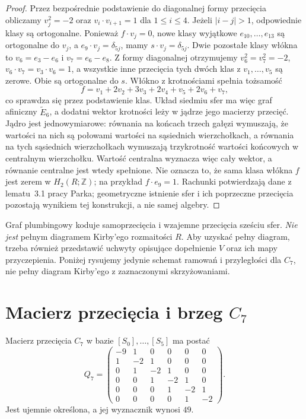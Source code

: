 \begin{proof}
Przez bezpośrednie podstawienie do diagonalnej formy przecięcia
obliczamy $v_j^2=-2$ oraz
$v_i\cdot v_{i+1}=1$ dla $1\le i\le4$.
Jeżeli $|i-j|>1$, odpowiednie klasy są ortogonalne.
Ponieważ $f\cdot v_j=0$, nowe klasy wyjątkowe
$e_{10},\ldots,e_{13}$ są ortogonalne do $v_j$, a
$e_9\cdot v_j=\delta_{5j}$, mamy
$s\cdot v_j=\delta_{5j}$.
Dwie pozostałe klasy włókna to
$v_6=e_3-e_6$ i $v_7=e_6-e_8$.
Z formy diagonalnej otrzymujemy $v_6^2=v_7^2=-2$,
$v_6\cdot v_7=v_3\cdot v_6=1$,
a wszystkie inne przecięcia tych dwóch klas
z $v_1,\ldots,v_5$ są zerowe.
Obie są ortogonalne do $s$.
Włókno z krotnościami spełnia tożsamość
\[
f=v_1+2v_2+3v_3+2v_4+v_5+2v_6+v_7,
\]
co sprawdza się przez podstawienie klas.
Układ siedmiu sfer ma więc graf afiniczny
$\widetilde E_6$, a dodatni wektor krotności
leży w jądrze jego macierzy przecięć.
Jądro jest jednowymiarowe: równania na końcach
trzech gałęzi wymuszają, że wartości na nich
są połowami wartości na sąsiednich wierzchołkach,
a równania na tych sąsiednich wierzchołkach
wymuszają trzykrotność wartości końcowych
w centralnym wierzchołku. Wartość centralna
wyznacza więc cały wektor, a równanie centralne
jest wtedy spełnione.
Nie oznacza to, że sama klasa włókna $f$ jest
zerem w $H_2(R;\mathbb Z)$; na przykład
$f\cdot e_9=1$.
Rachunki potwierdzają dane z lematu~3.1 pracy Parka;
geometryczne istnienie sfer i ich poprzeczne przecięcia
pozostają wynikiem tej konstrukcji, a nie samej algebry.
\end{proof}

\begin{uwaga}
Graf plumbingowy koduje samoprzecięcia i wzajemne
przecięcia sześciu sfer. \emph{Nie jest} pełnym diagramem
Kirby'ego rozmaitości $R$. Aby uzyskać pełny diagram,
trzeba również przedstawić uchwyty opisujące dopełnienie
$V$ oraz ich mapy przyczepienia. Poniżej rysujemy jedynie schemat ramowań
i przyległości dla $C_7$, nie pełny diagram Kirby'ego
z zaznaczonymi skrzyżowaniami.
\end{uwaga}

\section{Macierz przecięcia i brzeg \texorpdfstring{$C_7$}{C7}}
\label{sec:tg-park-boundary}

\begin{stwierdzenie}
\label{prop:tg-park-Q}
Macierz przecięcia $C_7$ w bazie $[S_0],\ldots,[S_5]$
ma postać
\[
Q_7=\begin{pmatrix}
-9&1&0&0&0&0\\
1&-2&1&0&0&0\\
0&1&-2&1&0&0\\
0&0&1&-2&1&0\\
0&0&0&1&-2&1\\
0&0&0&0&1&-2
\end{pmatrix}.
\]
Jest ujemnie określona, a jej wyznacznik wynosi $49$.
\end{stwierdzenie}

